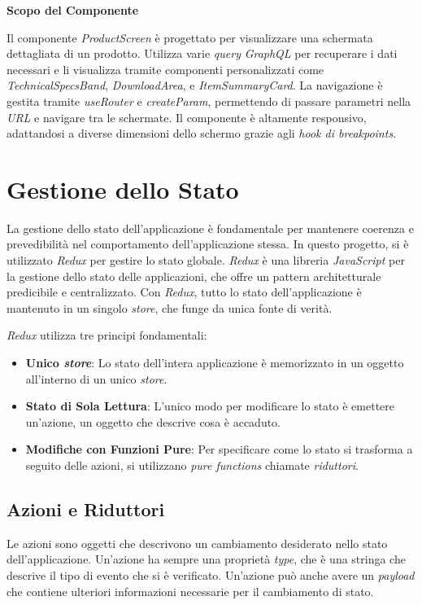 \textbf{Scopo del Componente}

Il componente \textit{ProductScreen} è progettato per visualizzare una schermata dettagliata di un prodotto.
Utilizza varie \textit{query} \textit{GraphQL} per recuperare i dati necessari e li visualizza tramite componenti personalizzati come \textit{TechnicalSpecsBand}, \textit{DownloadArea}, e \textit{ItemSummaryCard}.
La navigazione è gestita tramite \textit{useRouter} e \textit{createParam}, permettendo di passare parametri nella \textit{URL} e navigare tra le schermate.
Il componente è altamente responsivo, adattandosi a diverse dimensioni dello schermo grazie agli \textit{hook di breakpoints}.


\section{Gestione dello Stato}
\label{subsec:gestione_stato}

La gestione dello stato dell'applicazione è fondamentale per mantenere coerenza e prevedibilità nel comportamento dell'applicazione stessa.
In questo progetto, si è utilizzato \textit{Redux} per gestire lo stato globale.
\textit{Redux} è una libreria \textit{JavaScript} per la gestione dello stato delle applicazioni, che offre un pattern architetturale predicibile e centralizzato.
Con \textit{Redux}, tutto lo stato dell'applicazione è mantenuto in un singolo \textit{store}, che funge da unica fonte di verità.

\textit{Redux} utilizza tre principi fondamentali:
\begin{itemize}
    \item \textbf{Unico \textit{store}}: Lo stato dell'intera applicazione è memorizzato in un oggetto all'interno di un unico \textit{store}.
    \item \textbf{Stato di Sola Lettura}: L'unico modo per modificare lo stato è emettere un'azione, un oggetto che descrive cosa è accaduto.
    \item \textbf{Modifiche con Funzioni Pure}: Per specificare come lo stato si trasforma a seguito delle azioni, si utilizzano \textit{pure functions} chiamate \textit{riduttori}.
\end{itemize}

\subsection{Azioni e Riduttori}
\label{subsubsec:azioni_riduttori}

Le azioni sono oggetti che descrivono un cambiamento desiderato nello stato dell'applicazione.
Un'azione ha sempre una proprietà \textit{type}, che è una stringa che descrive il tipo di evento che si è verificato.
Un'azione può anche avere un \textit{payload} che contiene ulteriori informazioni necessarie per il cambiamento di stato.

